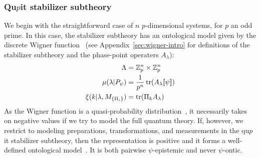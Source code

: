 \documentclass[%
 reprint, onecolumn, 12pt,
superscriptaddress,
nofootinbib,
 prx, 
]{quantumarticle}
\newcommand{\proj}[1]{{\bm[}#1{\bm]}}
\begin{document}
\subsubsection{Qu$p$it stabilizer subtheory}
\label{sec:quopit-wigner-model}


We begin with the straightforward case of $n$ $p$-dimensional systems,
for $p$ an odd prime. In this case, the stabilizer subtheory has an
ontological model given by the discrete Wigner
function~\cite{VeitchResourceTheoryStabilizer2014,GrossHudsonTheoremfinitedimensional2006}
(see Appendix~\ref{sec:wigner-intro} for definitions of the stabilizer
subtheory and the phase-point operaters $A_\lambda$):
\begin{align}
  \Lambda &= \mathbb{Z}_p^n\times\mathbb{Z}_p^n\nonumber\\
  \mu(\lambda|P_\psi) &= \frac{1}{p^n}\tr(A_\lambda\proj\psi)\nonumber\\
  \xi(k|\lambda,M_{\{\Pi_i\}}) &= \tr(\Pi_kA_\lambda)
\end{align}
As the Wigner function is a quasi-probability
distribution~\cite{FerrieQuasiprobabilityrepresentationsquantum2011},
it necessarily takes on negative values if we try to model the full
quantum theory. If, however, we restrict to modeling preparations,
transformations, and measurements in the qu$p$it stabilizer subtheory,
then the representation is positive and it forms a well-defined
ontological
model~\cite{GrossNonnegativeWignerfunctions2007,GrossHudsonTheoremfinitedimensional2006}. It
is both pairwise $\psi$-epistemic and never $\psi$-ontic.
\end{document}
